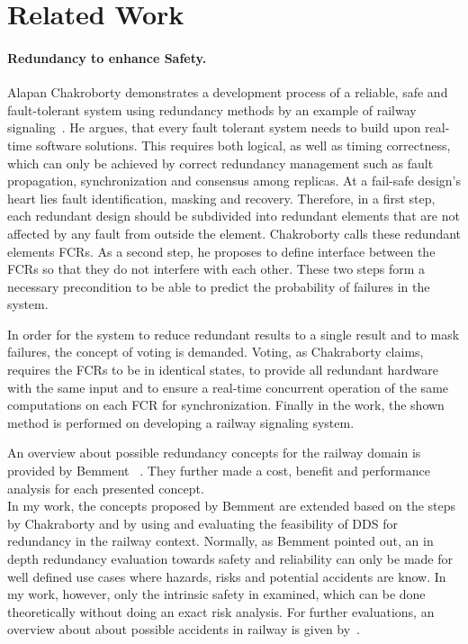 \section{Related Work}
\paragraph{Redundancy to enhance Safety.}
Alapan Chakroborty demonstrates a development process of a reliable, safe and fault-tolerant system using redundancy methods by an example of railway signaling~\cite{ChakrabortyFaultTolerantRailway}.
He argues, that every fault tolerant system needs to build upon real-time software solutions.
This requires both logical, as well as timing correctness, which can only be achieved by correct redundancy management such as fault propagation, synchronization and consensus among replicas.
At a fail-safe design's heart lies fault identification, masking and recovery.
Therefore, in a first step, each redundant design should be subdivided into redundant elements that are not affected by any fault from outside the element.
Chakroborty calls these redundant elements \glspl*{FCR}.
As a second step, he proposes to define interface between the \glspl*{FCR} so that they do not interfere with each other.
These two steps form a necessary precondition to be able to predict the probability of failures in the system.

In order for the system to reduce redundant results to a single result and to mask failures, the concept of voting is demanded.
Voting, as Chakraborty claims, requires the \glspl*{FCR} to be in identical states, to provide all redundant hardware with the same input and to ensure a real-time concurrent operation of the same computations on each \gls*{FCR} for synchronization.
Finally in the work, the shown method is performed on developing a railway signaling system.

An overview about possible redundancy concepts for the railway domain is provided by Bemment \etal~\cite{BemmentEvaluationOfRedundancy}.
They further made a cost, benefit and performance analysis for each presented concept.
\\

In my work, the concepts proposed by Bemment \etal are extended based on the steps by Chakraborty and by using and evaluating the feasibility of \gls*{DDS} for redundancy in the railway context.
Normally, as Bemment \etal pointed out, an in depth redundancy evaluation towards safety and reliability can only be made for well defined use cases where hazards, risks and potential accidents are know.
In my work, however, only the intrinsic safety in examined, which can be done theoretically without doing an exact risk analysis.
For further evaluations, an overview about about possible accidents in railway is given by~\cite{ERTMSRailwayAccidents}.
\\

